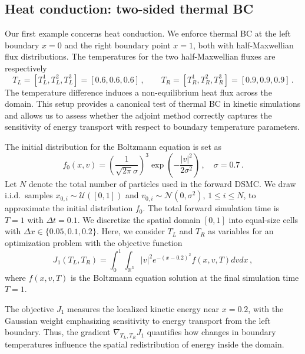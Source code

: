 \documentclass[12pt,nopreprintline]{elsarticle}
\newcommand{\bbR}{\mathbb R} \newcommand{\bbS}{\mathbb S}
\begin{document}
\subsection{Heat conduction: two-sided thermal BC}\label{subsec:test1}
Our first example concerns heat conduction. We enforce thermal BC at the left boundary $x=0$ and the right boundary point $x=1$, both with half-Maxwellian flux distributions. The temperatures for the two half-Maxwellian fluxes are respectively
\begin{equation}\label{eq:flux_temp}
T_L = [T_L^1,T_L^2,T_L^3 ] =  [0.6,0.6,0.6]\,,\qquad T_R= [T_R^1,T_R^2,T_R^3 ]=  [0.9,0.9,0.9]\,.
\end{equation}
The temperature difference induces a non-equilibrium heat flux across the domain. This setup provides a canonical test of thermal BC in kinetic simulations and allows us to assess whether the adjoint method correctly captures the sensitivity of energy transport with respect to boundary temperature parameters.

The initial distribution for the Boltzmann equation is set as
{
$$
f_0(x,v) = \left(\frac{1}{\sqrt{2\pi}\sigma}\right)^3\exp\left(-\frac{|v|^2}{2\sigma^2}\right)\,,\quad \sigma = 0.7\,.
$$
}
Let $N$ denote the total number of particles used in the forward DSMC. We draw i.i.d.~samples $x_{0,i}\sim \mathcal{U}([0,1])$ and $v_{0,i}\sim \mathcal{N}(0,\sigma^2)$, $1\leq i \leq N$, to approximate the initial distribution $f_0$. The total forward simulation time is $T = 1$ with $\Delta t = 0.1$. We discretize the spatial domain $[0,1]$ into equal-size cells with $\Delta x \in \{0.05, 0.1, 0.2\}$. Here, we consider $T_L$ and $T_R$ as variables for an optimization problem with the objective function
\[
J_1(T_L,T_R) = \int_0^1 \int_{\bbR^3}  |v|^2 e^{-(x-0.2)^2} f(x,v,T) dv dx\,,
\]
where $f(x,v,T)$ is the Boltzmann equation solution at the final simulation time $T = 1$.

The objective $J_1$ measures the localized kinetic energy near $x=0.2$, with the Gaussian weight emphasizing sensitivity to energy transport from the left boundary. Thus, the gradient $\nabla_{T_L,T_R} J_1$ quantifies how changes in boundary temperatures influence the spatial redistribution of energy inside the domain.
\end{document}
